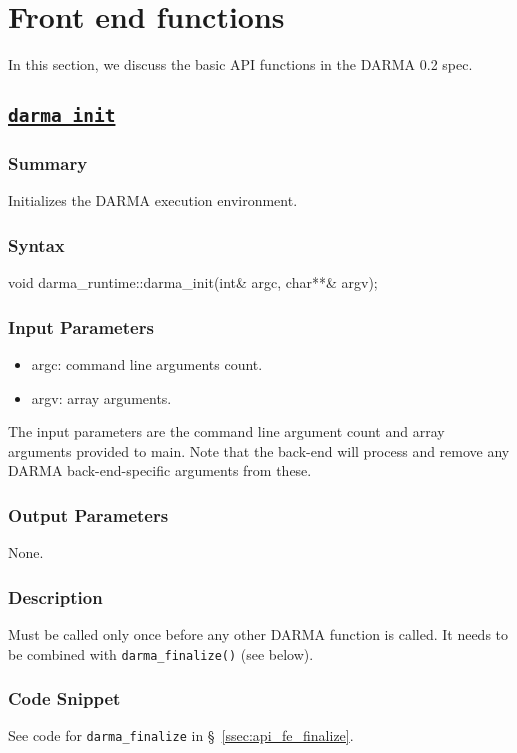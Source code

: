 \clearpage
\section{Front end functions}

In this section, we discuss the basic API 
functions in the DARMA 0.2 spec.


\subsection{\underline{\texttt{darma\_init}}}
\hspace{0.1cm} %
\begin{subs}
\vspace{-1.2cm}

\subsubsection{Summary}
Initializes the DARMA execution environment.

\subsubsection{Syntax} 
\begin{CppCode}
void darma_runtime::darma_init(int& argc, char**& argv);
\end{CppCode}

\subsubsection{Input Parameters} 
\begin{itemize}
\item argc: command line arguments count.
\item argv: array arguments.
\end{itemize}
The input parameters are the command line argument count 
and array arguments provided to main.  
Note that the back-end will process and remove 
any DARMA back-end-specific arguments from these.

\subsubsection{Output Parameters} 
None.


\subsubsection{Description} 
Must be called only once before any other DARMA function is called.
It needs to be combined with \texttt{darma\_finalize()} (see below).

\subsubsection{Code Snippet} 
See code for \texttt{darma\_finalize} in \S~\ref{ssec:api_fe_finalize}.

\end{subs}





